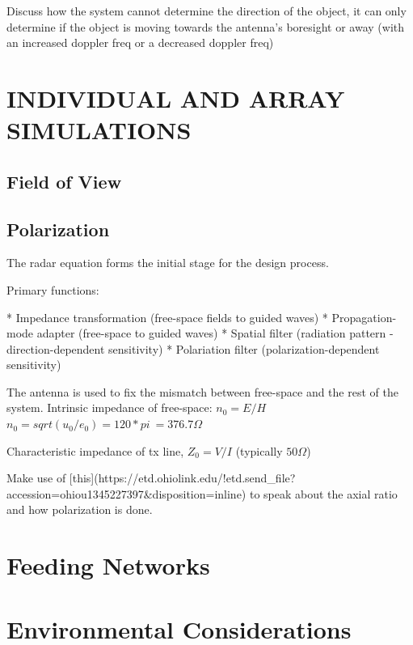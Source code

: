 \documentclass[11pt]{witseiepaper}
\begin{document}
Discuss how the system cannot determine the direction of the object, it can only determine if the object is moving towards the antenna's boresight or away (with an increased doppler freq or a decreased doppler freq)

\section{INDIVIDUAL AND ARRAY SIMULATIONS} \label{sec:INDIVIDUALANDARRAYSIMULATIONS}

\subsection{Field of View} \label{sec:FieldOfView}

\subsection{Polarization} \label{sec:Polarization}
The radar equation forms the initial stage for the design process.

Primary functions:

    * Impedance transformation (free-space fields to guided waves)
    * Propagation-mode adapter (free-space to guided waves)
    * Spatial filter (radiation pattern - direction-dependent sensitivity)
    * Polariation filter (polarization-dependent sensitivity)

The antenna is used to fix the mismatch between free-space and the rest of the system.
Intrinsic impedance of free-space: $n_0 = E/H$
$n_0 = sqrt(u_0 / e_0) = 120 * pi ~= 376.7 \Omega$

Characteristic impedance of tx line, $Z_0 = V/I$ (typically $50 \Omega$)



Make use of [this](https://etd.ohiolink.edu/!etd.send\_file?accession=ohiou1345227397\&disposition=inline) to speak about the axial ratio and how polarization is done.


\section{Feeding Networks} \label{sec:FeedingNetworks}


\section{Environmental Considerations} \label{sec:EnvironmentalConsiderations}
\end{document}
